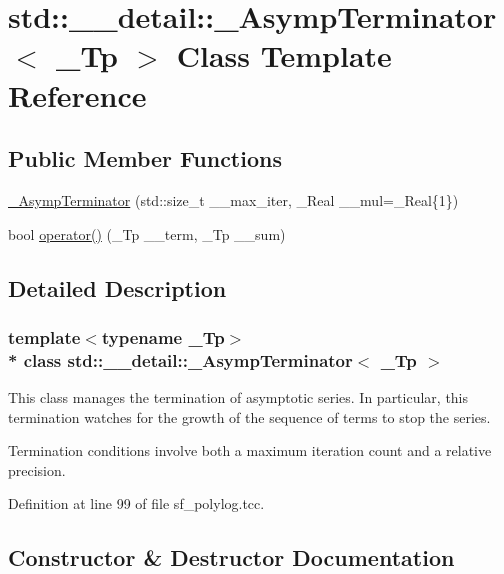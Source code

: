 \hypertarget{classstd_1_1____detail_1_1__AsympTerminator}{}\section{std\+:\+:\+\_\+\+\_\+detail\+:\+:\+\_\+\+Asymp\+Terminator$<$ \+\_\+\+Tp $>$ Class Template Reference}
\label{classstd_1_1____detail_1_1__AsympTerminator}
\subsection*{Public Member Functions}
\begin{DoxyCompactItemize}
\item 
\hyperlink{classstd_1_1____detail_1_1__AsympTerminator_a2a052a2ebedaa33cae3a6c07d73ca9cf}{\+\_\+\+Asymp\+Terminator} (std\+::size\+\_\+t \+\_\+\+\_\+max\+\_\+iter, \+\_\+\+Real \+\_\+\+\_\+mul=\+\_\+\+Real\{1\})
\item 
bool \hyperlink{classstd_1_1____detail_1_1__AsympTerminator_ad57254b6dcdd419b785477711b296729}{operator()} (\+\_\+\+Tp \+\_\+\+\_\+term, \+\_\+\+Tp \+\_\+\+\_\+sum)
\end{DoxyCompactItemize}


\subsection{Detailed Description}
\subsubsection*{template$<$typename \+\_\+\+Tp$>$\\*
class std\+::\+\_\+\+\_\+detail\+::\+\_\+\+Asymp\+Terminator$<$ \+\_\+\+Tp $>$}

This class manages the termination of asymptotic series. In particular, this termination watches for the growth of the sequence of terms to stop the series.

Termination conditions involve both a maximum iteration count and a relative precision. 

Definition at line 99 of file sf\+\_\+polylog.\+tcc.



\subsection{Constructor \& Destructor Documentation}
